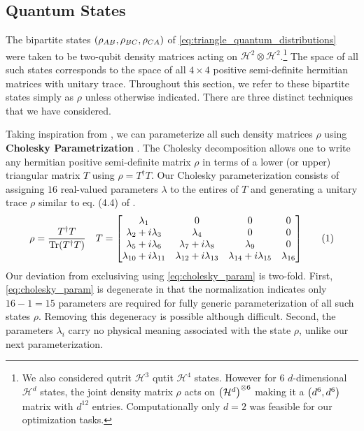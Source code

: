 \documentclass[aps, 10pt, english, twoside, pra, nofootinbib, longbibliography]{revtex4-1}
\theoremstyle{plain}
\theoremstyle{definition}
\theoremstyle{remark}
\newcommand{\Hilb}{\mathcal{H}}
\newcommand{\term}[1]{\textcolor{Mahogany}{\textbf{#1}}}
\begin{document}
    \subsection{Quantum States}
    The bipartite states $\br{\rho_{AB}, \rho_{BC}, \rho_{CA}}$ of \cref{eq:triangle_quantum_distributions} were taken to be two-qubit density matrices acting on $\Hilb^2 \otimes \Hilb^2$.\footnote{We also considered qutrit $\Hilb^3$ qutit $\Hilb^4$ states. However for $6$ $d$-dimensional $\Hilb^d$ states, the joint density matrix $\rho$ acts on $\br{\Hilb^d}^{\otimes 6}$ making it a $\br{d^6, d^6}$ matrix with $d^{12}$ entries. Computationally only $d = 2$ was feasible for our optimization tasks.} The space of all such states corresponds to the space of all $4\times 4$ positive semi-definite hermitian matrices with unitary trace. Throughout this section, we refer to these bipartite states simply as $\rho$ unless otherwise indicated. There are three distinct techniques that we have considered.

    Taking inspiration from \cite{James_2001}, we can parameterize all such density matrices $\rho$ using \term{Cholesky Parametrization} \cite{Grasmair_2014}. The Cholesky decomposition allows one to write any hermitian positive semi-definite matrix $\rho$ in terms of a lower (or upper) triangular matrix $T$ using $\rho = T^\dagger T$. Our Cholesky parameterization consists of assigning $16$ real-valued parameters $\lambda$ to the entires of $T$ and generating a unitary trace $\rho$ similar to eq. (4.4) of \cite{James_2001}.
    \[ \rho = \f{T^\dagger T}{\Tr\br{T^\dagger T}} \quad T = \pmtrx{\la_{1}&0&0&0\\\la_{2} + i \la_{3}&\la_{4}&0&0\\\la_{5} + i \la_{6}&\la_{7} + i \la_{8}&\la_{9}&0\\\la_{10} + i \la_{11}&\la_{12} + i \la_{13}&\la_{14} + i \la_{15}&\la_{16}} \eq \label{eq:cholesky_param} \]
    Our deviation from exclusiving using \cref{eq:cholesky_param} is two-fold. First, \cref{eq:cholesky_param} is degenerate in that the normalization indicates only $16 - 1 = 15$ parameters are required for fully generic parameterization of all such states $\rho$. Removing this degeneracy is possible although difficult. Second, the parameters $\lambda_i$ carry no physical meaning associated with the state $\rho$, unlike our next parameterization.
\end{document}
